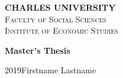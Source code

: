 \documentclass [a4paper,12pt]{report}
\def \BookName {Master's Thesis}
\def \AutorDP {Firstname Lastname}
\def \Year {2019}
\def \CUNI {CHARLES UNIVERSITY}
\def \FSS {Faculty of Social Sciences}
\def \IES {Institute of Economic Studies}
\begin{document}
\pagestyle{empty}

    \begin{center}
    {\LARGE \textbf{\CUNI}}\\[2ex]
    {\LARGE \textsc{\FSS}}\\[1ex]
 	  {\large \textsc{\IES}}

		\vspace{8.47cm}
		
    {\Huge \textbf{\BookName} \\[4ex]

    }

    \vfill

    {\Large \Year \hfill \AutorDP}\\[6ex]

    \newpage
    \end{center}
\end{document}
